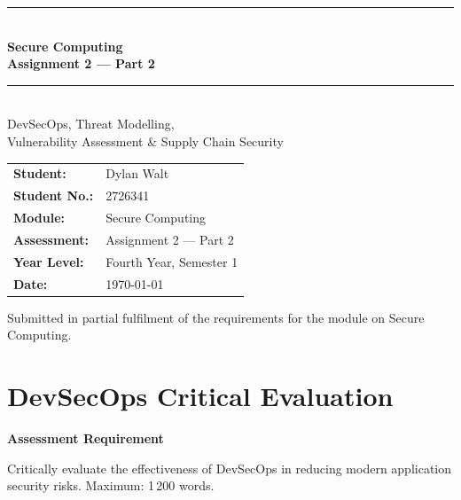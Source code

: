 \documentclass[12pt,a4paper]{article}
\newenvironment{secbox}[1]{%
  \begin{framed}
  \noindent\textbf{\color{phaseblue}#1}\par\medskip
}{%
  \end{framed}
}
\begin{document}
\onehalfspacing

\begin{titlepage}
  \centering
  \vspace*{1.5cm}
  {\color{phaseblue}\rule{\linewidth}{1.5pt}}\\[0.6em]
  {\Huge\bfseries\color{phaseblue} Secure Computing\\[0.3em]}
  {\Large\bfseries Assignment 2 --- Part 2\\[0.5em]}
  {\color{phaseblue}\rule{\linewidth}{1.5pt}}\\[2.5cm]

  {\large DevSecOps, Threat Modelling,\\[0.2em]
   Vulnerability Assessment \& Supply Chain Security}\\[3cm]

  \begin{tabular}{@{}ll@{}}
    \textbf{Student:}     & Dylan Walt \\[0.4em]
    \textbf{Student No.:} & 2726341 \\[0.4em]
    \textbf{Module:}      & Secure Computing \\[0.4em]
    \textbf{Assessment:}  & Assignment 2 --- Part 2 \\[0.4em]
    \textbf{Year Level:}  & Fourth Year, Semester 1 \\[0.4em]
    \textbf{Date:}        & \today \\
  \end{tabular}

  \vfill
  {\small Submitted in partial fulfilment of the requirements for the module on Secure Computing.}
\end{titlepage}

\newpage
\tableofcontents
\newpage

\section{DevSecOps Critical Evaluation}

\begin{secbox}{Assessment Requirement}
Critically evaluate the effectiveness of DevSecOps in reducing modern application security risks.
Maximum: 1\,200 words.
\end{secbox}
\end{document}
